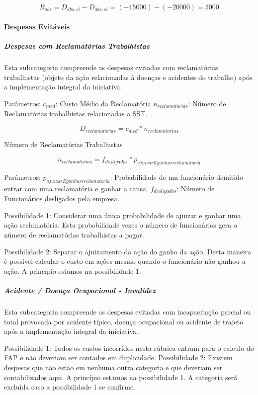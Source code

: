 \documentclass[]{article}
\let\oldparagraph\paragraph
\renewcommand{\paragraph}[1]{\oldparagraph{#1}\mbox{}}
\let\oldsubparagraph\subparagraph
\renewcommand{\subparagraph}[1]{\oldsubparagraph{#1}\mbox{}}
\begin{document}
\[B_{abs} = {D}_{abs, ci} - {D}_{abs, si} = (-15000)-(-20000) = 5000\]

\paragraph{Despesas Evitáveis}\label{despesas-evitaveis}

\subparagraph{Despesas com Reclamatórias
Trabalhistas}\label{despesas-com-reclamatorias-trabalhistas}

Esta subcategoria compreende as despesas evitadas com reclamatórias
trabalhistas (objeto da ação relacionadas à doenças e acidentes do
trabalho) após a implementação integral da iniciativa.

Parâmetros: \(c_{med}\): Custo Médio da Reclamatória
\(n_{reclamatorias}\): Número de Reclamatórias trabalhistas relacionadas
a SST.

\[{D}_{reclamatorias} = c_{med}*n_{reclamatorias} \]

Número de Reclamatórias Trabalhistas

\[n_{reclamatorias} = f_{desligados} * p_{ajuizarEganharreclamatoria} \]

Parâmetros: \(p_{ajuizarEganharreclamatoria}\): Probabilidade de um
funcionário demitido entrar com uma reclamatória e ganhar a causa.
\(f_{desligados}\): Número de Funcionários desligados pela empresa.

Possibilidade 1: Considerar uma única probabilidade de ajuizar e ganhar
uma ação reclamatória. Esta probabilidade vezes o número de funcionários
gera o número de reclamatórias trabalhistas a pagar.

Possibilidade 2: Separar o ajuizamento da ação do ganho da ação. Desta
maneira é possível calcular o custo em ações mesmo quando o funcionário
não ganhou a ação. A princípio estamos na possibilidade 1.

\subparagraph{Acidente / Doença Ocupacional -
Invalidez}\label{acidente-doenca-ocupacional---invalidez}

Esta subcategoria compreende as despesas evitadas com incapacitação
parcial ou total provocada por acidente típico, doença ocupacional ou
acidente de trajeto após a implementação integral da iniciativa.

Possibilidade 1: Todos os custos incorridos nesta rúbrica entram para o
calculo do FAP e não deveriam ser contados em duplicidade. Possibilidade
2: Existem despesas que não estão em nenhuma outra categoria e que
deveriam ser contabilizados aqui. A princípio estamos na possibilidade
1. A categoria será excluída caso a possibilidade 1 se confirme.
\end{document}
